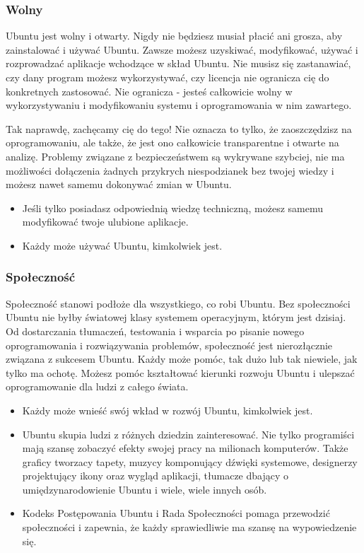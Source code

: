 \subsubsection{Wolny}
Ubuntu jest wolny i otwarty. Nigdy nie będziesz musiał płacić ani grosza, aby zainstalować i używać Ubuntu. Zawsze możesz uzyskiwać, modyfikować, używać i rozprowadzać aplikacje wchodzące w skład Ubuntu. Nie musisz się zastanawiać, czy dany program możesz wykorzystywać, czy licencja nie ogranicza cię do konkretnych zastosować. Nie ogranicza - jesteś całkowicie wolny w wykorzystywaniu i modyfikowaniu systemu i oprogramowania w nim zawartego.

Tak naprawdę, zachęcamy cię do tego! Nie oznacza to tylko, że zaoszczędzisz na oprogramowaniu, ale także, że jest ono całkowicie transparentne i otwarte na analizę. Problemy związane z bezpieczeństwem są wykrywane szybciej, nie ma możliwości dołączenia żadnych przykrych niespodzianek bez twojej wiedzy i możesz nawet samemu dokonywać zmian w Ubuntu.
\begin{itemize}
\item Jeśli tylko posiadasz odpowiednią wiedzę techniczną, możesz samemu modyfikować twoje ulubione aplikacje.
\item Każdy może używać Ubuntu, kimkolwiek jest.
\end{itemize}
\subsubsection{Społeczność}
Społeczność stanowi podłoże dla wszystkiego, co robi Ubuntu. Bez społeczności Ubuntu nie byłby światowej klasy systemem operacyjnym, którym jest dzisiaj. Od dostarczania tłumaczeń, testowania i wsparcia po pisanie nowego oprogramowania i rozwiązywania problemów, społeczność jest nierozłącznie związana z sukcesem Ubuntu. Każdy może pomóc, tak dużo lub tak niewiele, jak tylko ma ochotę. Możesz pomóc kształtować kierunki rozwoju Ubuntu i ulepszać oprogramowanie dla ludzi z całego świata.
\begin{itemize}
\item Każdy może wnieść swój wkład w rozwój Ubuntu, kimkolwiek jest.
\item Ubuntu skupia ludzi z różnych dziedzin zainteresować. Nie tylko programiści mają szansę zobaczyć efekty swojej pracy na milionach komputerów. Także graficy tworzacy tapety, muzycy komponujący dźwięki systemowe, designerzy projektujący ikony oraz wygląd aplikacji, tłumacze dbający o umiędzynarodowienie Ubuntu i wiele, wiele innych osób.
\item Kodeks Postępowania Ubuntu i Rada Społeczności pomaga przewodzić społeczności i zapewnia, że każdy sprawiedliwie ma szansę na wypowiedzenie się.
\end{itemize}




